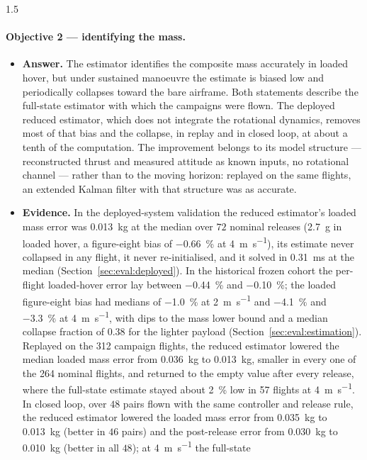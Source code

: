 \begin{spacing}{1.5}
\paragraph{Objective 2 --- identifying the mass.}
\begin{itemize}
\item \textbf{Answer.} The estimator identifies the composite mass accurately in
loaded hover, but under sustained manoeuvre the estimate is biased low and
periodically collapses toward the bare airframe. Both statements describe the
full-state estimator with which the campaigns were flown. The deployed reduced
estimator, which does not integrate the rotational dynamics, removes most of
that bias and the collapse, in replay and in closed loop, at about a tenth of
the computation. The improvement belongs to its model structure --- reconstructed
thrust and measured attitude as known inputs, no rotational channel --- rather
than to the moving horizon: replayed on the same flights, an extended Kalman
filter with that structure was as accurate.
\item \textbf{Evidence.} In the deployed-system validation the reduced
estimator's loaded mass error was \SI{0.013}{\kg} at the median over $72$
nominal releases (\SI{2.7}{\gram} in loaded hover, a figure-eight bias of
\SI{-0.66}{\percent} at \SI{4}{\meter\per\second}), its estimate never
collapsed in any flight, it never re-initialised, and it solved in
\SI{0.31}{\milli\second} at the median (Section~\ref{sec:eval:deployed}). In
the historical frozen cohort the per-flight loaded-hover error
lay between \SI{-0.44}{\percent} and \SI{-0.10}{\percent}; the loaded
figure-eight bias had medians of \SI{-1.0}{\percent} at
\SI{2}{\meter\per\second} and \SI{-4.1}{\percent} and \SI{-3.3}{\percent} at
\SI{4}{\meter\per\second}, with dips to the mass lower bound and a median
collapse fraction of $0.38$ for the lighter payload
(Section~\ref{sec:eval:estimation}). Replayed on the 312 campaign flights, the reduced
estimator lowered the median loaded mass error from \SI{0.036}{\kg} to
\SI{0.013}{\kg}, smaller in every one of the 264 nominal flights, and returned to
the empty value after every release, where the full-state estimate stayed about
\SI{2}{\percent} low in 57 flights at \SI{4}{\meter\per\second}. In closed loop,
over $48$ pairs flown with the same controller and release rule, the reduced
estimator lowered the loaded mass error from \SI{0.035}{\kg} to \SI{0.013}{\kg}
(better in $46$ pairs) and the post-release error from \SI{0.030}{\kg} to
\SI{0.010}{\kg} (better in all $48$); at \SI{4}{\meter\per\second} the full-state

\end{itemize}
\end{spacing}
